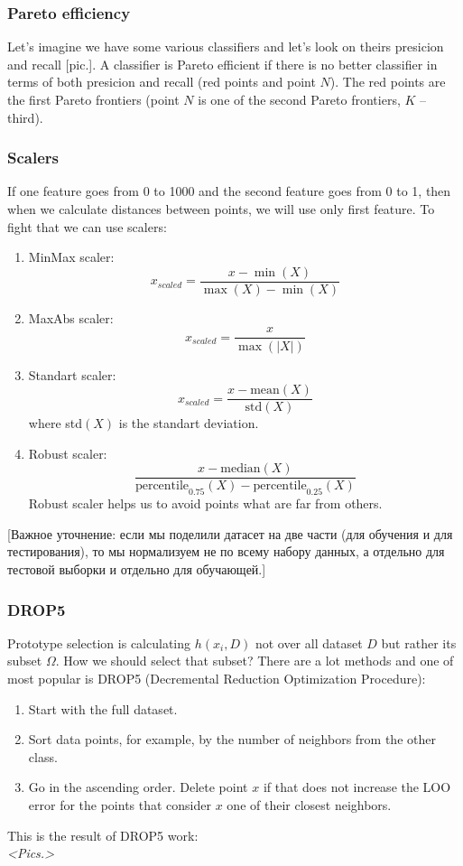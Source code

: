 \subsubsection*{Pareto efficiency}

Let's imagine we have some various classifiers and let's look on theirs presicion and recall [pic.]. A classifier is Pareto efficient if there is no better classifier in terms of both presicion and recall (red points and point $N$). The red points are the first Pareto frontiers (point $N$ is one of the second Pareto frontiers, $K$ -- third).

\subsubsection*{Scalers}

If one feature goes from 0 to 1000 and the second feature goes from 0 to 1, then when we calculate distances between points, we will use only first feature. To fight that we can use scalers:
\begin{enumerate}[label=$\bullet$]
	\item MinMax scaler: $$x_{scaled}=\frac{x-\min(X)}{\max(X)-\min(X)}$$
	\item MaxAbs scaler: $$x_{scaled}=\frac{x}{\max(|X|)}$$
	\item Standart scaler: $$x_{scaled}=\frac{x-\text{mean}(X)}{\text{std}(X)}$$ where std$(X)$ is the standart deviation.
	\item Robust scaler: $$\frac{x-\text{median}(X)}{\text{percentile}_{0.75}(X)-\text{percentile}_{0.25}(X)}$$
	Robust scaler helps us to avoid points what are far from others.
\end{enumerate}
[Важное уточнение: если мы поделили датасет на две части (для обучения и для тестирования), то мы нормализуем не по всему набору данных, а отдельно для тестовой выборки и отдельно для обучающей.]

\subsubsection*{DROP5}

Prototype selection is calculating $h(x_i, D)$ not over all dataset $D$ but rather its subset $\Omega$. How we should select that subset? There are a lot methods and one of most popular is DROP5 (Decremental Reduction Optimization Procedure):
\begin{enumerate}
	\item Start with the full dataset.
	\item Sort data points, for example, by the number of neighbors from the other class.
	\item Go in the ascending order. Delete point $x$ if that does not increase the LOO error for the points that consider $x$ one of their closest neighbors.
\end{enumerate}
This is the result of DROP5 work:\\
{\it <Pics.>}

